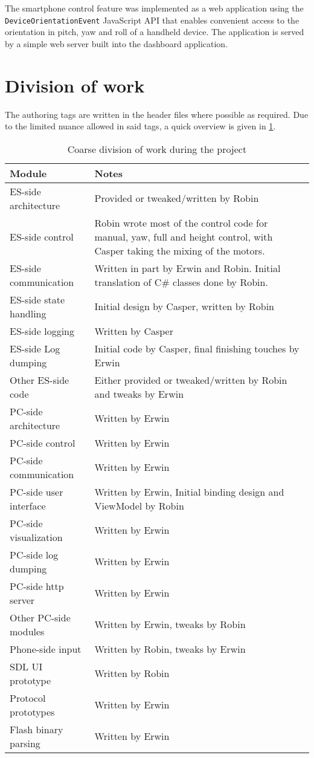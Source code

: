 \documentclass[final]{article}
\begin{document}
The smartphone control feature was implemented as a web application using the \texttt{DeviceOrientationEvent} JavaScript API that enables convenient access to the orientation in pitch, yaw and roll of a handheld device.
The application is served by a simple web server built into the dashboard application.


\section{Division of work}
The authoring tags are written in the header files where possible as required.
Due to the limited nuance allowed in said tags, a quick overview is given in \cref{tab:work-division}.

\begin{table}[H]
    \caption{Coarse division of work during the project}
    \label{tab:work-division}
    \centering
    \begin{tabular}{lp{12cm}}
    \toprule
    Module                   & Notes \\
    \midrule
    ES-side architecture & Provided or tweaked/written by Robin \\
    ES-side control & Robin wrote most of the control code for manual, yaw, full and height control, with Casper taking the mixing of the motors. \\
    ES-side communication & Written in part by Erwin and Robin. Initial translation of C\# classes done by Robin.\\
    ES-side state handling & Initial design by Casper, written by Robin \\
    ES-side logging & Written by Casper \\
    ES-side Log dumping & Initial code by Casper, final finishing touches by Erwin \\
    Other ES-side code & Either provided or tweaked/written by Robin and tweaks by Erwin \\
    \midrule
    PC-side architecture & Written by Erwin \\
    PC-side control & Written by Erwin \\
    PC-side communication & Written by Erwin \\
    PC-side user interface & Written by Erwin, Initial binding design and ViewModel by Robin \\
    PC-side visualization & Written by Erwin \\
    PC-side log dumping & Written by Erwin \\
    PC-side http server & Written by Erwin \\
    Other PC-side modules & Written by Erwin, tweaks by Robin \\
    \midrule
    Phone-side input & Written by Robin, tweaks by Erwin \\
    SDL UI prototype & Written by Robin \\
    Protocol prototypes & Written by Erwin \\
    Flash binary parsing & Written by Erwin \\
    \bottomrule
    \end{tabular}
\end{table}
\end{document}
